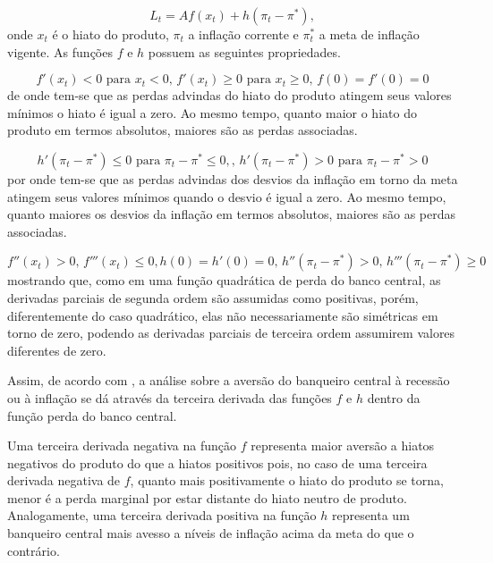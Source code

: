 \documentclass[
	article,			%
	11pt,				%
	oneside,			%
	a4paper,			%
	english,			%
	brazil,				%
	]{abntex2}
\begin{document}
	\begin{equation} \label{funcao_perda_aberta}
		L_t = Af(x_t) + h(\pi_t - \pi^*),
	\end{equation}
	onde $x_t$ é o hiato do produto, $\pi_t$ a inflação corrente e $\pi_t^*$ a meta de inflação vigente. As funções $f$ e $h$ possuem as seguintes propriedades.
	
	\begin{equation}
		f'(x_t) < 0 \mbox{ para } x_t < 0 \mbox{, } f'(x_t) \geq 0 \mbox{ para } x_t \geq 0 \mbox{, } f(0) = f'(0) = 0
	\end{equation}
	de onde tem-se que as perdas advindas do hiato do produto atingem seus valores mínimos o hiato é igual a zero. Ao mesmo tempo, quanto maior o hiato do produto em termos absolutos, maiores são as perdas associadas.

	\begin{equation}
		h'(\pi_t-\pi^*) \leq 0 \mbox{ para } \pi_t - \pi^* \leq 0, \nonumber \mbox{, } h'(\pi_t-\pi^*) > 0 \mbox{ para } \pi_t - \pi^* > 0 
	\end{equation}
	por onde tem-se que as perdas advindas dos desvios da inflação em torno da meta atingem seus valores mínimos quando o desvio é igual a zero. Ao mesmo tempo, quanto maiores os desvios da inflação em termos absolutos, maiores são as perdas associadas.
	
	\begin{equation}
		f''(x_t)>0 \mbox{, } f'''(x_t) \leq 0,\nonumber   h(0)=h'(0)=0 \mbox{, } h''(\pi_t-\pi^*)>0 \mbox{, } h'''(\pi_t-\pi^*) \geq 0
	\end{equation}
	mostrando que, como em uma função quadrática de perda do banco central, as derivadas parciais de segunda ordem são assumidas como positivas, porém, diferentemente do caso quadrático, elas não necessariamente são simétricas em torno de zero, podendo as derivadas parciais de terceira ordem assumirem valores diferentes de zero.
	
	Assim, de acordo com , a análise sobre a aversão do banqueiro central à recessão ou à inflação se dá através da terceira derivada das funções $f$ e $h$ dentro da função perda do banco central. 
	
	Uma terceira derivada negativa na função $f$ representa maior aversão a hiatos negativos do produto do que a hiatos positivos pois, no caso de uma terceira derivada negativa de $f$, quanto mais positivamente o hiato do produto se torna, menor é a perda marginal por estar distante do hiato neutro de produto. Analogamente, uma terceira derivada positiva na função $h$ representa um banqueiro central mais avesso a níveis de inflação acima da meta do que o contrário.	
	
\end{document}
